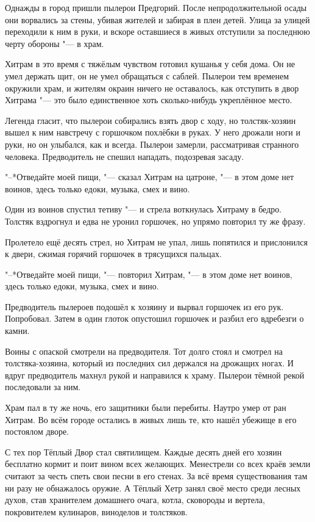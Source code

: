 Однажды в город пришли пылерои Предгорий.
После непродолжительной осады они ворвались за стены, убивая жителей и забирая в плен детей.
Улица за улицей переходили к ним в руки, и вскоре оставшиеся в живых отступили за последнюю черту обороны "--- в храм.

Хитрам в это время с тяжёлым чувством готовил кушанья у себя дома.
Он не умел держать щит, он не умел обращаться с саблей.
Пылерои тем временем окружили храм, и жителям окраин ничего не оставалось, как отступить в двор Хитрама "--- это было единственное хоть сколько-нибудь укреплённое место.

Легенда гласит, что пылерои собирались взять двор с ходу, но толстяк-хозяин вышел к ним навстречу с горшочком похлёбки в руках.
У него дрожали ноги и руки, но он улыбался, как и всегда.
Пылерои замерли, рассматривая странного человека.
Предводитель не спешил нападать, подозревая засаду.

"--*Отведайте моей пищи, "--- сказал Хитрам на цатроне, "--- в этом доме нет воинов, здесь только едоки, музыка, смех и вино.

Один из воинов спустил тетиву "--- и стрела воткнулась Хитраму в бедро.
Толстяк вздрогнул и едва не уронил горшочек, но упрямо повторил ту же фразу.

Пролетело ещё десять стрел, но Хитрам не упал, лишь попятился и прислонился к двери, сжимая горячий горшочек в трясущихся пальцах.

"--*Отведайте моей пищи, "--- повторил Хитрам, "--- в этом доме нет воинов, здесь только едоки, музыка, смех и вино.

Предводитель пылероев подошёл к хозяину и вырвал горшочек из его рук.
Попробовал.
Затем в один глоток опустошил горшочек и разбил его вдребезги о камни.

Воины с опаской смотрели на предводителя.
Тот долго стоял и смотрел на толстяка-хозяина, который из последних сил держался на дрожащих ногах.
И вдруг предводитель махнул рукой и направился к храму.
Пылерои тёмной рекой последовали за ним.

Храм пал в ту же ночь, его защитники были перебиты.
Наутро умер от ран Хитрам.
Во всём городе остались в живых лишь те, кто нашёл убежище в его постоялом дворе.

С тех пор Тёплый Двор стал святилищем.
Каждые десять дней его хозяин бесплатно кормит и поит вином всех желающих.
Менестрели со всех краёв земли считают за честь спеть свои песни в его стенах.
За всё время существования там ни разу не обнажалось оружие.
А Тёплый Хетр занял своё место среди лесных духов, став хранителем домашнего очага, котла, сковороды и вертела, покровителем кулинаров, виноделов и толстяков.

